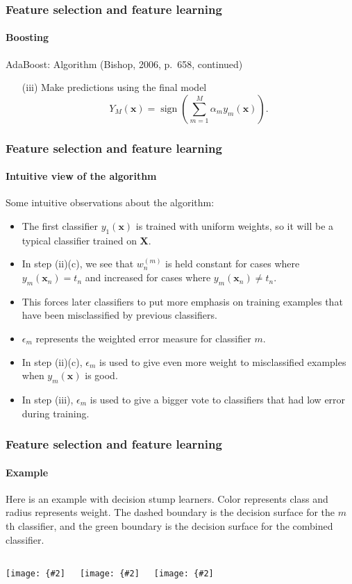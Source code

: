 \documentclass[aspectratio=169]{beamer}
\renewcommand{\vec}[1]{\boldsymbol{#1}}
\DeclareMathOperator*{\sign}{sign}
\newcommand{\myfig}[3]{\centerline{\texttt{[image: \{\#2]}}}
\begin{document}
\begin{frame}
\frametitle{Feature selection and feature learning}
\framesubtitle{Boosting}

\begin{block}{AdaBoost: Algorithm (Bishop, 2006, p.\ 658, continued)}
\begin{itemize}
\item[(iii)] Make predictions using the final model
  \begin{equation*}
  Y_M(\vec{x}) = \sign \left( \sum_{m=1}^M \alpha_m y_m(\vec{x})
  \right).
  \end{equation*}
\end{itemize}
\end{block}

\end{frame}


\begin{frame}
\frametitle{Feature selection and feature learning}
\framesubtitle{Intuitive view of the algorithm}

Some intuitive observations about the algorithm:
\begin{itemize}
\item The first classifier $y_1(\vec{x})$ is trained with uniform
  weights, so it will be a typical classifier trained on $\vec{X}$.
\item In step (ii)(c), we see that $w_n^{(m)}$ is \alert{held
    constant} for cases where $y_m(\vec{x}_n) = t_n$ and
  \alert{increased} for cases where $y_m(\vec{x}_n) \not= t_n$.
\item This forces \alert{later classifiers} to put \alert{more
    emphasis} on training examples that have been
  \alert{misclassified} by previous classifiers.
\item $\epsilon_m$ represents the weighted error measure for
  classifier $m$.
\item In step (ii)(c), $\epsilon_m$ is used to give \alert{even more
    weight} to misclassified examples when $y_m(\vec{x})$ is good.
\item In step (iii), $\epsilon_m$ is used to give a \alert{bigger
    vote} to classifiers that had \alert{low error} during training.
\end{itemize}

\end{frame}


\begin{frame}
\frametitle{Feature selection and feature learning}
\framesubtitle{Example}

Here is an example with \alert{decision stump} learners.  Color
represents class and radius represents weight. The dashed boundary is
the decision surface for the $m$th classifier, and the green boundary
is the decision surface for the combined classifier.

\medskip

\begin{columns}
\column{1.5in}
\myfig{1.6in}{Bishop-fig14-2a.pdf}{}
\column{1.5in}
\myfig{1.6in}{Bishop-fig14-2b.pdf}{Bishop (2006), Fig.\ 14.2(a)-(c)}
\column{1.5in}
\myfig{1.6in}{Bishop-fig14-2c.pdf}{}
\end{columns}

\end{frame}
\end{document}
